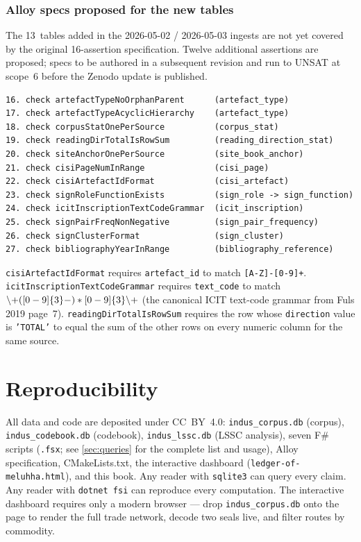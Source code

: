 \subsubsection*{Alloy specs proposed for the new tables}

The 13~tables added in the 2026-05-02 / 2026-05-03 ingests are not
yet covered by the original 16-assertion specification. Twelve
additional assertions are proposed; specs to be authored in a
subsequent revision and run to UNSAT at scope~6 before the
Zenodo update is published.

{\small
\begin{verbatim}
16. check artefactTypeNoOrphanParent      (artefact_type)
17. check artefactTypeAcyclicHierarchy    (artefact_type)
18. check corpusStatOnePerSource          (corpus_stat)
19. check readingDirTotalIsRowSum         (reading_direction_stat)
20. check siteAnchorOnePerSource          (site_book_anchor)
21. check cisiPageNumInRange              (cisi_page)
22. check cisiArtefactIdFormat            (cisi_artefact)
23. check signRoleFunctionExists          (sign_role -> sign_function)
24. check icitInscriptionTextCodeGrammar  (icit_inscription)
25. check signPairFreqNonNegative         (sign_pair_frequency)
26. check signClusterFormat               (sign_cluster)
27. check bibliographyYearInRange         (bibliography_reference)
\end{verbatim}
}

\noindent
\texttt{cisiArtefactIdFormat} requires \texttt{artefact\_id} to
match \texttt{[A-Z]-[0-9]+}. \texttt{icitInscriptionTextCodeGrammar}
requires \texttt{text\_code} to match
$\backslash{\rm +([0-9]\{3\}-)*[0-9]\{3\}\backslash{\rm +}}$
(the canonical ICIT text-code grammar from Fuls 2019 page~7).
\texttt{readingDirTotalIsRowSum} requires the row whose
\texttt{direction} value is \texttt{'TOTAL'} to equal the sum of
the other rows on every numeric column for the same source.

\section{Reproducibility}\label{sec:repro}

All data and code are deposited under CC~BY~4.0:
\texttt{indus\_corpus.db} (corpus),
\texttt{indus\_codebook.db} (codebook),
\texttt{indus\_lssc.db} (LSSC analysis),
seven F\# scripts (\texttt{.fsx}; see \cref{sec:queries} for the
complete list and usage),
Alloy specification, CMakeLists.txt,
the interactive dashboard (\texttt{ledger-of-meluhha.html}),
and this book.
Any reader with \texttt{sqlite3} can query every claim.
Any reader with \texttt{dotnet fsi} can reproduce every
computation.
The interactive dashboard requires only a modern browser ---
drop \texttt{indus\_corpus.db} onto the page to render the
full trade network, decode two seals live, and filter routes
by commodity.

